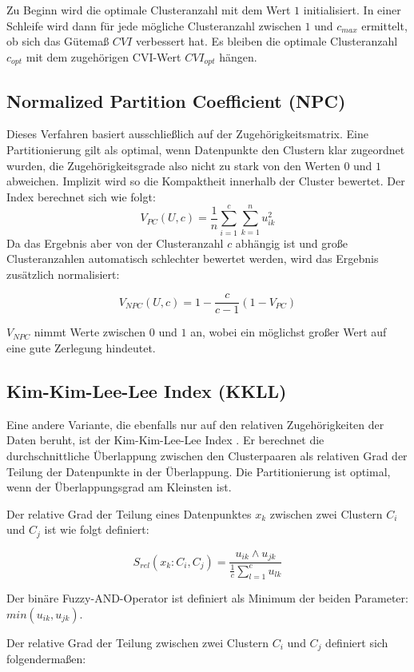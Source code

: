 \documentclass[11pt,ceqn]{book}
\begin{document}
Zu Beginn wird die optimale Clusteranzahl mit dem Wert $1$ initialisiert. In einer Schleife wird dann für jede mögliche Clusteranzahl zwischen $1$ und $c_{max}$ ermittelt, ob sich das Gütemaß $CVI$ verbessert hat. Es bleiben die optimale Clusteranzahl $c_{opt}$ mit dem zugehörigen CVI-Wert $CVI_{opt}$ hängen.  

\subsection{Normalized Partition Coefficient (NPC)}
Dieses Verfahren \cite{npc} basiert ausschließlich auf der Zugehörigkeitsmatrix. Eine Partitionierung gilt als optimal, wenn Datenpunkte den Clustern klar zugeordnet wurden, die Zugehörigkeitsgrade also nicht zu stark von den Werten $0$ und $1$ abweichen. Implizit wird so die Kompaktheit innerhalb der Cluster bewertet. Der Index berechnet sich wie folgt:
$$V_{PC}(U,c) = \frac{1}{n} \sum\limits_{i=1}^c \sum\limits_{k=1}^n u_{ik}^2$$
Da das Ergebnis aber von der Clusteranzahl $c$ abhängig ist und große Clusteranzahlen automatisch schlechter bewertet werden, wird das Ergebnis zusätzlich normalisiert:

$$V_{NPC}(U,c) = 1- \frac{c}{c-1}\left(1-V_{PC}\right)$$

$V_{NPC}$ nimmt Werte zwischen $0$ und $1$ an, wobei ein möglichst großer Wert auf eine gute Zerlegung hindeutet.

\subsection{Kim-Kim-Lee-Lee Index (KKLL)}
Eine andere Variante, die ebenfalls nur auf den relativen Zugehörigkeiten der Daten beruht, ist der Kim-Kim-Lee-Lee Index \cite{kkll}. Er berechnet die durchschnittliche Überlappung zwischen den Clusterpaaren als relativen Grad der Teilung der Datenpunkte in der Überlappung. Die Partitionierung ist optimal, wenn der Überlappungsgrad am Kleinsten ist.

Der relative Grad der Teilung eines Datenpunktes $x_k$ zwischen zwei
Clustern $C_i$ und $C_j$ ist wie folgt definiert:

$$S_{rel}(x_k\colon C_i,C_j) = \frac{u_{ik} \land u_{jk}}{\frac{1}{c} \sum\limits_{l=1}^c u_{lk}}$$

Der binäre Fuzzy-AND-Operator ist definiert als Minimum der beiden Parameter: $min(u_{ik}, u_{jk})$.

Der relative Grad der Teilung zwischen zwei Clustern $C_i$ und $C_j$ definiert sich folgendermaßen:
\end{document}
